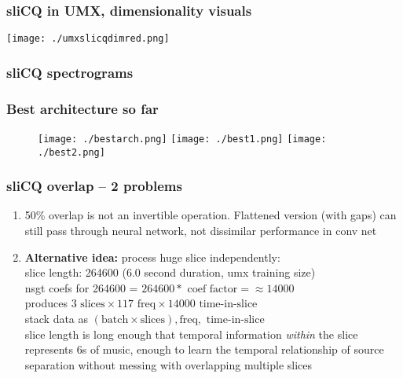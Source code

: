 \documentclass[usenames,dvipsnames]{beamer}
\begin{document}
\begin{frame}
	\frametitle{sliCQ in UMX, dimensionality visuals}
	\texttt{[image: ./umxslicqdimred.png]}
\end{frame}

\begin{frame}
	\frametitle{sliCQ spectrograms}
	\begin{figure}
	\end{figure}
\end{frame}

\begin{frame}
	\frametitle{Best architecture so far}
	\begin{figure}
		\texttt{[image: ./bestarch.png]}
		\texttt{[image: ./best1.png]}
		\texttt{[image: ./best2.png]}
	\end{figure}
\end{frame}

\begin{frame}
	\frametitle{sliCQ overlap -- 2 problems}
	\begin{enumerate}
		\item
			50\% overlap is not an invertible operation. Flattened version (with gaps) can still pass through neural network, not dissimilar performance in conv net
		\item
			\textbf{Alternative idea:} process huge slice independently:\\
			slice length: 264600 (6.0 second duration, umx training size)\\
			nsgt coefs for 264600 = $264600 * \text{ coef factor} = \approx 14000$\\
			produces $3 \text{ slices} \times 117 \text{ freq} \times 14000 \text{ time-in-slice}$\\
			stack data as $(\text{batch} \times \text{slices}), \text{freq}, \text { time-in-slice}$\\
			slice length is long enough that temporal information \textit{within} the slice represents 6s of music, enough to learn the temporal relationship of source separation without messing with overlapping multiple slices
	\end{enumerate}
\end{frame}
\end{document}
